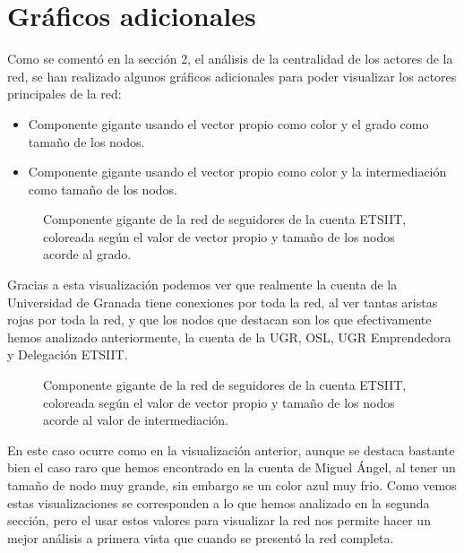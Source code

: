 \section{Gráficos adicionales}

Como se comentó en la sección 2, el análisis de la centralidad de los actores de la red, se han realizado algunos gráficos adicionales para poder visualizar los actores principales de la red:

\begin{itemize}
	\item Componente gigante usando el vector propio como color y el grado como tamaño de los nodos.
	\item Componente gigante usando el vector propio como color y la intermediación como tamaño de los nodos.
\end{itemize}


\newpage
\begin{figure}[H]
	\centering
	
	\caption{Componente gigante de la red de seguidores de la cuenta ETSIIT, coloreada según el valor de vector propio y tamaño de los nodos acorde al grado.}
\end{figure}
\vspace{18cm}
Gracias a esta visualización podemos ver que realmente la cuenta de la Universidad de Granada tiene conexiones por toda la red, al ver tantas aristas rojas por toda la red, y que los nodos que destacan son los que efectivamente hemos analizado anteriormente, la cuenta de la UGR, OSL, UGR Emprendedora y Delegación ETSIIT.
\newpage

\newpage
\begin{figure}[H]
	\centering
	
	\caption{Componente gigante de la red de seguidores de la cuenta ETSIIT, coloreada según el valor de vector propio y tamaño de los nodos acorde al valor de intermediación.}
\end{figure}
\vspace{18cm}
En este caso ocurre como en la visualización anterior, aunque se destaca bastante bien el caso raro que hemos encontrado en la cuenta de Miguel Ángel, al tener un tamaño de nodo muy grande, sin embargo se un color azul muy frio. Como vemos estas visualizaciones se corresponden a lo que hemos analizado en la segunda sección, pero el usar estos valores para visualizar la red nos permite hacer un mejor análisis a primera vista que cuando se presentó la red completa. 
\newpage
